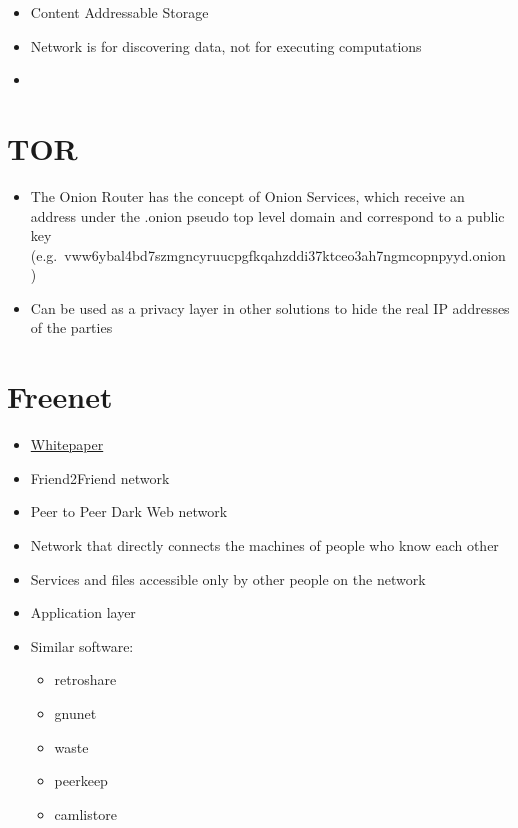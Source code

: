 \begin{itemize}
\tightlist
\item
  Content Addressable Storage
\item
  Network is for discovering data, not for executing computations
\item
\end{itemize}

\label{notes__02130-tor.md}
\section{TOR}\label{notes__02130-tor.md__tor}

\begin{itemize}
\tightlist
\item
  The Onion Router has the concept of Onion Services, which receive an address under the .onion pseudo top level domain and correspond to a public key (e.g.~vww6ybal4bd7szmgncyruucpgfkqahzddi37ktceo3ah7ngmcopnpyyd.onion)
\item
  Can be used as a privacy layer in other solutions to hide the real IP addresses of the parties
\end{itemize}

\label{notes__02140-freenet.md}
\section{Freenet}\label{notes__02140-freenet.md__freenet}

\begin{itemize}
\tightlist
\item
  \href{https://homepage.divms.uiowa.edu/~ghosh/freenet.pdf}{Whitepaper}
\item
  Friend2Friend network
\item
  Peer to Peer Dark Web network
\item
  Network that directly connects the machines of people who know each other
\item
  Services and files accessible only by other people on the network
\item
  Application layer
\item
  Similar software:

  \begin{itemize}
  \tightlist
  \item
    retroshare
  \item
    gnunet
  \item
    waste
  \item
    peerkeep
  \item
    camlistore
  \end{itemize}
\end{itemize}

